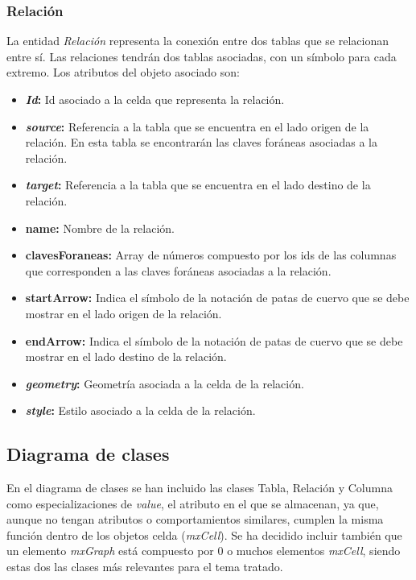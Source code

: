 \subsubsection{Relación}

La entidad \emph{Relación} representa la conexión entre dos tablas que se relacionan entre sí. Las relaciones tendrán dos tablas asociadas, con un símbolo para cada extremo. Los atributos del objeto asociado son:
\begin{itemize}
    \item \textbf{\textit{Id}: }Id asociado a la celda que representa la relación.
    \item \textbf{\textit{source}: }Referencia a la tabla que se encuentra en el lado origen de la relación. En esta tabla se encontrarán las claves foráneas asociadas a la relación.
    \item \textbf{\textit{target}: }Referencia a la tabla que se encuentra en el lado destino de la relación.
    \item \textbf{name: }Nombre de la relación.
    \item \textbf{clavesForaneas: }Array de números compuesto por los ids de las columnas que corresponden a las claves foráneas asociadas a la relación.
    \item \textbf{startArrow: }Indica el símbolo de la notación de patas de cuervo que se debe mostrar en el lado origen de la relación.
    \item \textbf{endArrow: }Indica el símbolo de la notación de patas de cuervo que se debe mostrar en el lado destino de la relación.
    \item \textbf{\textit{geometry}: }Geometría asociada a la celda de la relación.
    \item \textbf{\textit{style}: }Estilo asociado a la celda de la relación.
\end{itemize}

\subsection{Diagrama de clases}


En el diagrama de clases se han incluido las clases Tabla, Relación y Columna como especializaciones de \emph{value}, el atributo en el que se almacenan, ya que, aunque no tengan atributos o comportamientos similares, cumplen la misma función dentro de los objetos celda (\textit{mxCell}). Se ha decidido incluir también que un elemento \emph{mxGraph} está compuesto por 0 o muchos elementos \emph{mxCell}, siendo estas dos las clases más relevantes para el tema tratado.

